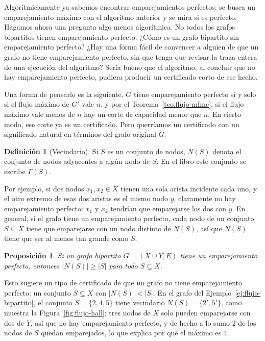 \documentclass[12pt, spanish, oneside, openany]{book}
\theoremstyle{uprightplain}
\newtheorem{proposicion}[teorema]{Proposición}
\theoremstyle{definition}
\newtheorem{definicion}[teorema]{Definición}
\theoremstyle{remark}
\theoremstyle{definition}
\begin{document}
Algorítmicamente ya sabemos encontrar emparejamientos perfectos: se busca un emparejamiento máximo con el algoritmo anterior y se mira si es perfecto. Hagamos ahora una pregunta algo menos algorítmica. No todos los grafos bipartitos tienen emparejamiento perfecto. ¿Cómo es un grafo bipartito sin emparejamiento perfecto? ¿Hay una forma fácil de convencer a alguien de que un grafo no tiene emparejamiento perfecto, sin que tenga que revisar la traza entera de una ejecución del algoritmo? Sería bueno que el algoritmo, al concluir que no hay emparejamiento perfecto, pudiera producir un certificado corto de ese hecho.

Una forma de pensarlo es la siguiente. $G$ tiene emparejamiento perfecto si y solo si el flujo máximo de $G'$ vale $n$, y por el Teorema~\ref{teo:flujo-mfmc}, si el flujo máximo vale menos de $n$ hay un corte de capacidad menor que $n$. En cierto modo, ese corte ya es un certificado. Pero querríamos un certificado con un significado natural en términos del grafo original $G$.

\begin{definicion}[Vecindario]
\label{def:flujo-vecindario}
Si $S$ es un conjunto de nodos, $N(S)$ denota el conjunto de nodos adyacentes a algún nodo de $S$. En el libro este conjunto se escribe $\Gamma(S)$.
\end{definicion}

Por ejemplo, si dos nodos $x_1,x_2\in X$ tienen una sola arista incidente cada uno, y el otro extremo de esas dos aristas es el mismo nodo $y$, claramente no hay emparejamiento perfecto: $x_1$ y $x_2$ tendrían que emparejarse los dos con $y$. En general, si el grafo tiene un emparejamiento perfecto, cada nodo de un conjunto $S\subseteq X$ tiene que emparejarse con un nodo distinto de $N(S)$, así que $N(S)$ tiene que ser al menos tan grande como $S$.

\begin{proposicion}
\label{prop:flujo-hall-necesaria}
Si un grafo bipartito $G=(X\cup Y,E)$ tiene un emparejamiento perfecto, entonces $|N(S)|\ge|S|$ para todo $S\subseteq X$.
\end{proposicion}

Esto sugiere un tipo de certificado de que un grafo no tiene emparejamiento perfecto: un conjunto $S\subseteq X$ con $|N(S)|<|S|$. En el grafo del Ejemplo~\ref{ej:flujo-bipartito}, el conjunto $S=\{2,4,5\}$ tiene vecindario $N(S)=\{2',5'\}$, como muestra la Figura~\ref{fig:flujo-hall}; tres nodos de $X$ solo pueden emparejarse con dos de $Y$, así que no hay emparejamiento perfecto, y de hecho a lo sumo $2$ de los nodos de $S$ quedan emparejados, lo que explica por qué el máximo es $4$.
\end{document}
